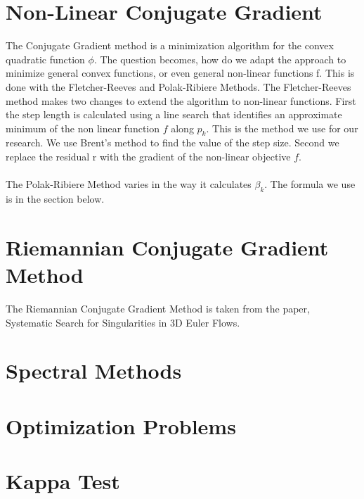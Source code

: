 \documentclass[12pt]{article}
\begin{document}
\begin{flushleft}
\section{Non-Linear Conjugate Gradient}

\qquad The Conjugate Gradient method is a minimization algorithm for the convex quadratic function $\phi$. The question becomes, how do we adapt the approach to minimize general convex functions, or even general non-linear functions f. This is done with the Fletcher-Reeves and Polak-Ribiere Methods. The Fletcher-Reeves method makes two changes to extend the algorithm to non-linear functions. First the step length is calculated using a line search that identifies an approximate minimum of the non linear function $f$ along $p_k$. This is the method we use for our research. We use Brent's method to find the value of the step size. Second we replace the residual r with the gradient of the non-linear objective $f$.
\\~\\
The Polak-Ribiere Method varies in the way it calculates $\beta_k$. The formula we use is in the section below.

\section{Riemannian Conjugate Gradient Method}

\qquad The Riemannian Conjugate Gradient Method is taken from the paper, Systematic Search for Singularities in 3D Euler Flows. 

\section{Spectral Methods}

\section{Optimization Problems}

\section{Kappa Test}


\end{flushleft}
\end{document}
